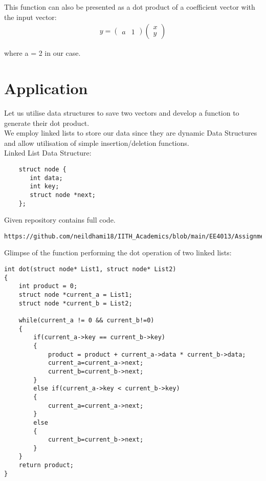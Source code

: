 \documentclass[journal,12pt,twocolumn]{IEEEtran}
\begin{document}
This function can also be presented as a dot product of a coefficient vector with the input vector:
\begin{align}
    y = \begin{pmatrix} a & 1 \end{pmatrix} 
    \begin{pmatrix} x \\ y \end{pmatrix}
\end{align}

where a = 2 in our case.

\section{Application}

Let us utilise data structures to save two vectors and develop a function to generate their dot product.\\
We employ linked lists to store our data since they are dynamic Data Structures and allow utilisation of simple insertion/deletion functions.\\
Linked List Data Structure:

\begin{lstlisting}
    struct node {
       int data;
       int key;
       struct node *next;
    };
\end{lstlisting}

Given repository contains full code.
\lstset{language=XML, basicstyle=\ttfamily}
\begin{lstlisting}
https://github.com/neildhami18/IITH_Academics/blob/main/EE4013/Assignment1/codes/dot_product.c
\end{lstlisting}
Glimpse of the function performing the dot operation of two linked lists:

\begin{lstlisting}
int dot(struct node* List1, struct node* List2)
{
    int product = 0;
    struct node *current_a = List1;
    struct node *current_b = List2;

    while(current_a != 0 && current_b!=0)
    {
        if(current_a->key == current_b->key)
        {
            product = product + current_a->data * current_b->data;
            current_a=current_a->next;
            current_b=current_b->next;
        }
        else if(current_a->key < current_b->key)
        {
            current_a=current_a->next;
        }
        else
        {
            current_b=current_b->next;
        }
    }
    return product;
}

\end{lstlisting}
\end{document}
